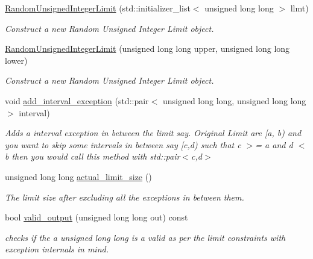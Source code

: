 \begin{DoxyCompactItemize}
\item 
\mbox{\hyperlink{classtestcaser_1_1maker_1_1RandomUnsignedIntegerLimit_a8535b952828f59d17c69caae62f4c4e1}{Random\+Unsigned\+Integer\+Limit}} (std\+::initializer\+\_\+list$<$ unsigned long long $>$ llmt)
\begin{DoxyCompactList}\small\item\em Construct a new Random Unsigned Integer Limit object. \end{DoxyCompactList}\item 
\mbox{\hyperlink{classtestcaser_1_1maker_1_1RandomUnsignedIntegerLimit_a4299cc026c1ed26b595c248c6e243f8c}{Random\+Unsigned\+Integer\+Limit}} (unsigned long long upper, unsigned long long lower)
\begin{DoxyCompactList}\small\item\em Construct a new Random Unsigned Integer Limit object. \end{DoxyCompactList}\item 
void \mbox{\hyperlink{classtestcaser_1_1maker_1_1RandomUnsignedIntegerLimit_a979b5384118ab1f3c20366ae3e9bff7a}{add\+\_\+interval\+\_\+exception}} (std\+::pair$<$ unsigned long long, unsigned long long $>$ interval)
\begin{DoxyCompactList}\small\item\em Adds a interval exception in between the limit say. Original Limit are \mbox{[}a, b) and you want to skip some intervals in between say \mbox{[}c,d) such that c $>$= a and d $<$ b then you would call this method with std\+::pair$<$c,d$>$ \end{DoxyCompactList}\item 
unsigned long long \mbox{\hyperlink{classtestcaser_1_1maker_1_1RandomUnsignedIntegerLimit_a8235c0a24e918b66eafdfb4987d3258a}{actual\+\_\+limit\+\_\+size}} ()
\begin{DoxyCompactList}\small\item\em The limit size after excluding all the exceptions in between them. \end{DoxyCompactList}\item 
bool \mbox{\hyperlink{classtestcaser_1_1maker_1_1RandomUnsignedIntegerLimit_af38fd933b010cd1877e012ed40b2cafa}{valid\+\_\+output}} (unsigned long long out) const
\begin{DoxyCompactList}\small\item\em checks if the a unsigned long long is a valid as per the limit constraints with exception internals in mind. \end{DoxyCompactList}\end{DoxyCompactItemize}
